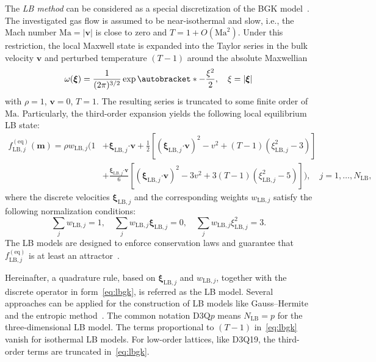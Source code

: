 \documentclass{article}
\newcommand{\Ma}{\mathrm{Ma}}
\newcommand{\OO}[1]{O(#1)}
\DeclarePairedDelimiter\autobracket()       %
\newcommand{\br}[1]{\autobracket*{#1}}
\newcommand{\bxi}{{\boldsymbol{\xi}}}
\newcommand{\bm}{\boldsymbol{m}}
\newcommand{\bv}{\boldsymbol{v}}
\newcommand{\bdot}{\boldsymbol{\cdot}}
\newcommand{\equil}[1]{#1^\mathrm{(eq)}}
\newcommand{\LB}{\mathrm{LB}}
\begin{document}
The \emph{LB method} can be considered as a special discretization of the BGK model~\cite{Succi2001}.
The investigated gas flow is assumed to be near-isothermal and slow,
i.e., the Mach number \(\Ma = |\bv|\) is close to zero and \(T = 1 + \OO{\Ma^2}\).
Under this restriction, the local Maxwell state is expanded into the Taylor series
in the bulk velocity \(\bv\) and perturbed temperature \((T-1)\)
around the absolute Maxwellian
\begin{equation}\label{eq:omega}
    \omega(\bxi) = \frac{1}{(2\pi)^{3/2}}\exp\br{ -\frac{\xi^2}{2} }, \quad \xi = |\bxi|
\end{equation}
with \(\rho=1\), \(\bv=0\), \(T=1\).
The resulting series is truncated to some finite order of \(\Ma\).
Particularly, the third-order expansion yields the following local equilibrium LB state:
\begin{equation}\label{eq:lbgk}
    \begin{aligned}
    \equil{f}_{\LB,j}(\bm) = \rho w_{\LB,j}\bigg( 1
        &+ \bxi_{\LB,j}\bdot\bv
        + \frac12\left[ (\bxi_{\LB,j}\bdot\bv)^2 - v^2 + (T-1)(\xi_{\LB,j}^2 - 3) \right] \\
        &+ \frac{\bxi_{\LB,j}\bdot\bv}6\left[ (\bxi_{\LB,j}\bdot\bv)^2 - 3v^2 + 3(T-1)(\xi_{\LB,j}^2-5) \right]
    \bigg), \quad j = 1,\ldots,N_\LB,
    \end{aligned}
\end{equation}
where the discrete velocities \(\bxi_{\LB,j}\) and the corresponding weights \(w_{\LB,j}\)
satisfy the following normalization conditions:
\begin{equation}
    \sum_j w_{\LB,j} = 1, \quad \sum_j w_{\LB,j} \bxi_{\LB,j} = 0, \quad \sum_j w_{\LB,j} \xi_{\LB,j}^2 = 3.
\end{equation}
The LB models are designed to enforce conservation laws
and guarantee that \(\equil{f}_{\LB,j}\) is at least an attractor~\cite{Luo2000}.

Hereinafter, a quadrature rule, based on \(\bxi_{\LB,j}\) and \(w_{\LB,j}\),
together with the discrete operator in form~\eqref{eq:lbgk},
is referred as the LB model.
Several approaches can be applied for the construction of LB models
like Gauss--Hermite~\cite{He1997, Shan1998, Shan2006, Shan2010}
and the entropic method~\cite{Karlin1999, Chikatamarla2006, Chikatamarla2009}.
The common notation D3Q\(p\) means \(N_\LB=p\) for the three-dimensional LB model.
The terms proportional to \((T-1)\) in~\eqref{eq:lbgk} vanish for isothermal LB models.
For low-order lattices, like D3Q19, the third-order terms are truncated in~\eqref{eq:lbgk}.
\end{document}
